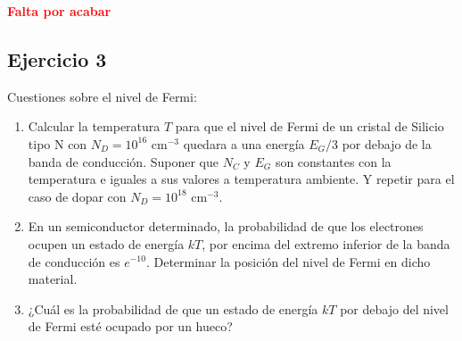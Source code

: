 \begin{Anotacion}
    \textcolor{red}{\textbf{Falta por acabar}}
\end{Anotacion}
\begin{Enunciado}
\subsection*{Ejercicio 3}

	Cuestiones sobre el nivel de Fermi:

	\begin{enumerate}[label=\alph*)]
		\item Calcular la temperatura \( T \) para que el nivel de Fermi de un cristal de Silicio tipo N con \( N_D = 10^{16} \) cm\(^{-3}\) quedara a una energía \( E_G/3 \) por debajo de la banda de conducción. Suponer que \( N_C \) y \( E_G \) son constantes con la temperatura e iguales a sus valores a temperatura ambiente. Y repetir para el caso de dopar con \( N_D = 10^{18} \) cm\(^{-3}\).

		\item En un semiconductor determinado, la probabilidad de que los electrones ocupen un estado de energía \( kT \), por encima del extremo inferior de la banda de conducción es \( e^{-10} \). Determinar la posición del nivel de Fermi en dicho material.

		\item ¿Cuál es la probabilidad de que un estado de energía \( kT \) por debajo del nivel de Fermi esté ocupado por un hueco?
	\end{enumerate}

\end{Enunciado}

